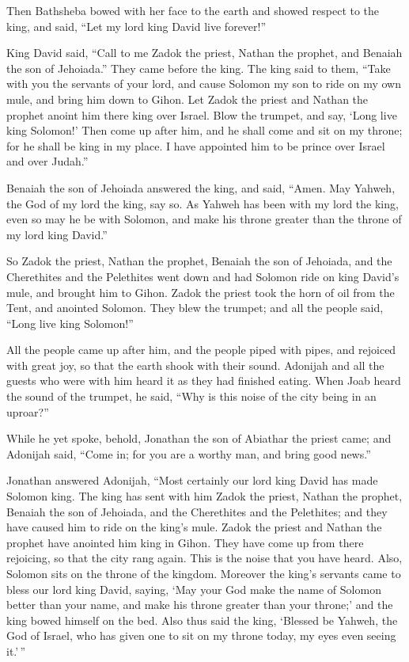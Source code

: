  Then Bathsheba bowed with her face to the earth and
showed respect to the king, and said, ``Let my lord king David live
forever!''

 King David said, ``Call to me Zadok the priest, Nathan
the prophet, and Benaiah the son of Jehoiada.'' They came before the
king.  The king said to them, ``Take with you the
servants of your lord, and cause Solomon my son to ride on my own mule,
and bring him down to Gihon.  Let Zadok the priest and
Nathan the prophet anoint him there king over Israel. Blow the trumpet,
and say, `Long live king Solomon!'  Then come up after
him, and he shall come and sit on my throne; for he shall be king in my
place. I have appointed him to be prince over Israel and over Judah.''

 Benaiah the son of Jehoiada answered the king, and said,
``Amen. May Yahweh, the God of my lord the king, say so. 
As Yahweh has been with my lord the king, even so may he be with
Solomon, and make his throne greater than the throne of my lord king
David.''

 So Zadok the priest, Nathan the prophet, Benaiah the son
of Jehoiada, and the Cherethites and the Pelethites went down and had
Solomon ride on king David's mule, and brought him to Gihon.
 Zadok the priest took the horn of oil from the Tent, and
anointed Solomon. They blew the trumpet; and all the people said, ``Long
live king Solomon!''

 All the people came up after him, and the people piped
with pipes, and rejoiced with great joy, so that the earth shook with
their sound.  Adonijah and all the guests who were with
him heard it as they had finished eating. When Joab heard the sound of
the trumpet, he said, ``Why is this noise of the city being in an
uproar?''

 While he yet spoke, behold, Jonathan the son of Abiathar
the priest came; and Adonijah said, ``Come in; for you are a worthy man,
and bring good news.''

 Jonathan answered Adonijah, ``Most certainly our lord
king David has made Solomon king.  The king has sent with
him Zadok the priest, Nathan the prophet, Benaiah the son of Jehoiada,
and the Cherethites and the Pelethites; and they have caused him to ride
on the king's mule.  Zadok the priest and Nathan the
prophet have anointed him king in Gihon. They have come up from there
rejoicing, so that the city rang again. This is the noise that you have
heard.  Also, Solomon sits on the throne of the kingdom.
 Moreover the king's servants came to bless our lord king
David, saying, `May your God make the name of Solomon better than your
name, and make his throne greater than your throne;' and the king bowed
himself on the bed.  Also thus said the king, `Blessed be
Yahweh, the God of Israel, who has given one to sit on my throne today,
my eyes even seeing it.'\,''

